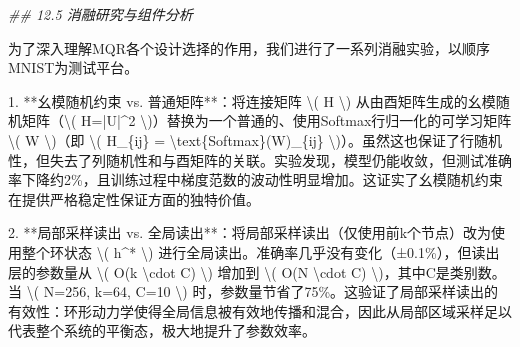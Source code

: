 \documentclass[
  12pt,
]{article}
\newenvironment{Shaded}{}{}
\newcommand{\CommentTok}[1]{\textcolor[rgb]{0.38,0.63,0.69}{\textit{#1}}}
\newcommand{\DecValTok}[1]{\textcolor[rgb]{0.25,0.63,0.44}{#1}}
\newcommand{\FloatTok}[1]{\textcolor[rgb]{0.25,0.63,0.44}{#1}}
\newcommand{\NormalTok}[1]{#1}
\newcommand{\OperatorTok}[1]{\textcolor[rgb]{0.40,0.40,0.40}{#1}}
\begin{document}
\begin{Shaded}
\begin{Highlighting}[]
\CommentTok{\#\# 12.5 消融研究与组件分析}

\NormalTok{为了深入理解MQR各个设计选择的作用，我们进行了一系列消融实验，以顺序MNIST为测试平台。}

\FloatTok{1.}  \OperatorTok{**}\NormalTok{幺模随机约束 vs. 普通矩阵}\OperatorTok{**}\NormalTok{：将连接矩阵 }\OperatorTok{\textbackslash{}}\NormalTok{( H }\OperatorTok{\textbackslash{}}\NormalTok{) 从由酉矩阵生成的幺模随机矩阵（}\OperatorTok{\textbackslash{}}\NormalTok{( H}\OperatorTok{=|}\NormalTok{U}\OperatorTok{|\^{}}\DecValTok{2} \OperatorTok{\textbackslash{}}\NormalTok{)）替换为一个普通的、使用Softmax行归一化的可学习矩阵 }\OperatorTok{\textbackslash{}}\NormalTok{( W }\OperatorTok{\textbackslash{}}\NormalTok{)（即 }\OperatorTok{\textbackslash{}}\NormalTok{( H\_\{ij\} }\OperatorTok{=} \OperatorTok{\textbackslash{}}\NormalTok{text\{Softmax\}(W)\_\{ij\} }\OperatorTok{\textbackslash{}}\NormalTok{)）。虽然这也保证了行随机性，但失去了列随机性和与酉矩阵的关联。实验发现，模型仍能收敛，但测试准确率下降约}\DecValTok{2}\OperatorTok{\%}\NormalTok{，且训练过程中梯度范数的波动性明显增加。这证实了幺模随机约束在提供严格稳定性保证方面的独特价值。}

\FloatTok{2.}  \OperatorTok{**}\NormalTok{局部采样读出 vs. 全局读出}\OperatorTok{**}\NormalTok{：将局部采样读出（仅使用前k个节点）改为使用整个环状态 }\OperatorTok{\textbackslash{}}\NormalTok{( h}\OperatorTok{\^{}*} \OperatorTok{\textbackslash{}}\NormalTok{) 进行全局读出。准确率几乎没有变化（±}\FloatTok{0.1}\OperatorTok{\%}\NormalTok{），但读出层的参数量从 }\OperatorTok{\textbackslash{}}\NormalTok{( O(k }\OperatorTok{\textbackslash{}}\NormalTok{cdot C) }\OperatorTok{\textbackslash{}}\NormalTok{) 增加到 }\OperatorTok{\textbackslash{}}\NormalTok{( O(N }\OperatorTok{\textbackslash{}}\NormalTok{cdot C) }\OperatorTok{\textbackslash{}}\NormalTok{)，其中C是类别数。当 }\OperatorTok{\textbackslash{}}\NormalTok{( N}\OperatorTok{=}\DecValTok{256}\NormalTok{, k}\OperatorTok{=}\DecValTok{64}\NormalTok{, C}\OperatorTok{=}\DecValTok{10} \OperatorTok{\textbackslash{}}\NormalTok{) 时，参数量节省了}\DecValTok{75}\OperatorTok{\%}\NormalTok{。这验证了局部采样读出的有效性：环形动力学使得全局信息被有效地传播和混合，因此从局部区域采样足以代表整个系统的平衡态，极大地提升了参数效率。}


\end{Highlighting}
\end{Shaded}
\end{document}
